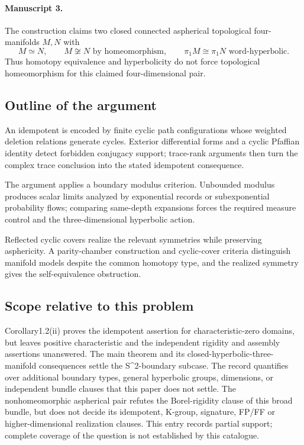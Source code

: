 \documentclass[11pt]{article}
\begin{document}
\paragraph{Manuscript 3.}
The construction claims two closed connected aspherical topological four-manifolds \(M,N\) with
\[
 M\simeq N,\qquad M\not\cong N\text{ by homeomorphism},\qquad
 \pi_1M\cong\pi_1N\text{ word-hyperbolic}.
\]
Thus homotopy equivalence and hyperbolicity do not force topological homeomorphism for this claimed four-dimensional pair.

\subsection{Outline of the argument}
An idempotent is encoded by finite cyclic path configurations whose weighted deletion relations generate cycles. Exterior differential forms and a cyclic Pfaffian identity detect forbidden conjugacy support; trace-rank arguments then turn the complex trace conclusion into the stated idempotent consequence.

The argument applies a boundary modulus criterion. Unbounded modulus produces scalar limits analyzed by exponential records or subexponential probability flows; comparing same-depth expansions forces the required measure control and the three-dimensional hyperbolic action.

Reflected cyclic covers realize the relevant symmetries while preserving asphericity. A parity-chamber construction and cyclic-cover criteria distinguish manifold models despite the common homotopy type, and the realized symmetry gives the self-equivalence obstruction.

\subsection{Scope relative to this problem}
Corollary1.2(ii) proves the idempotent assertion for characteristic-zero domains, but leaves positive characteristic and the independent rigidity and assembly assertions unanswered. The main theorem and its closed-hyperbolic-three-manifold consequences settle the S\textasciicircum{}2-boundary subcase. The record quantifies over additional boundary types, general hyperbolic groups, dimensions, or independent bundle clauses that this paper does not settle. The nonhomeomorphic aspherical pair refutes the Borel-rigidity clause of this broad bundle, but does not decide its idempotent, K-group, signature, FP/FF or higher-dimensional realization clauses. This entry records partial support; complete coverage of the question is not established by this catalogue.
\end{document}
